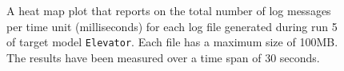 \begin{figure}[htbp]
\centering
\begin{minipage}{1\textwidth}
  \centering
\end{minipage}
\caption{A heat map plot that reports on the total number of log messages per time unit (milliseconds) for each log file generated during run 5 of target model \texttt{Elevator}. Each file has a maximum size of 100MB. The results have been measured over a time span of 30 seconds.}
\label{figure:throughput_sum_elevator_5}
\end{figure}